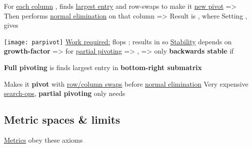 \begin{itemize}

      \vItem
            For \underline{each column} , finds \underline{largest entry} and {row-swaps} to make
            it \underline{new pivot} => 
      \vItem
            Then performs \underline{normal elimination} on that column => 
      \vItem
            Result is ,
            where 
      \vItem
            Setting
            ,
             gives 

            \texttt{[image: parpivot]}
      \vItem
            \underline{Work required:}  flops
            ; results in  so 
      \vItem
            \underline{Stability} depends on \textbf{growth-factor}
            => for \underline{partial pivoting} 
      \vItem
             =>
            ,
            => only \textbf{backwards stable} if 
\end{itemize}

\hSep %

\textbf{Full pivoting} is  finds largest entry in \textbf{bottom-right submatrix}
\begin{itemize}
      \vItem
            Makes it \textbf{pivot} with \underline{row/column swaps} before \underline{normal elimination}
      \vItem
            Very expensive  \underline{search-ops}, \textbf{partial pivoting} only needs 
\end{itemize}


\subsection*{Metric spaces \& limits}

\underline{Metrics} obey these axioms



